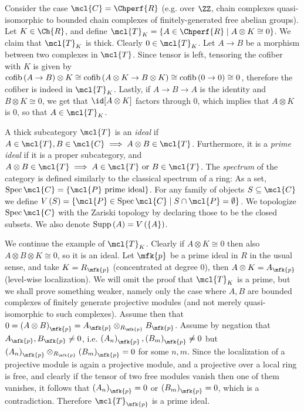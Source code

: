 \begin{example}\label{chperf-tk}
	Consider the case $\mcl{C} = \Chperf{R}$ (e.g. over $\ZZ$, chain complexes quasi-isomorphic to bounded chain complexes of finitely-generated free abelian groups).
	Let $K \in \Ch{R}$, and define
	$\mcl{T}_K = \left\{ A \in \Chperf{R} \mid A \otimes K \cong 0 \right\}$.
	We claim that $\mcl{T}_K$ is thick.
	Clearly $0 \in \mcl{T}_K$.
	Let $A \to B$ be a morphism between two complexes in $\mcl{T}$. Since tensor is left, tensoring the cofiber with $K$ is given by
	$\operatorname{cofib}\left(A \to B\right) \otimes K \cong \operatorname{cofib}\left(A \otimes K \to B \otimes K\right) \cong \operatorname{cofib}\left(0 \to 0\right) \cong 0$, therefore the cofiber is indeed in $\mcl{T}_K$.
	Lastly, if $A \to B \to A$ is the identity and $B \otimes K \cong 0$, we get that $\id[A \otimes K]$ factors through $0$, which implies that $A \otimes K$ is $0$, so that $A \in \mcl{T}_K$.
\end{example}

\begin{definition}
	A thick subcategory $\mcl{T}$ is an \emph{ideal} if $A \in \mcl{T}, B \in \mcl{C} \implies A \otimes B \in \mcl{T}$.
	Furthermore, it is a \emph{prime ideal} if it is a proper subcategory, and $A \otimes B \in \mcl{T} \implies A \in \mcl{T} \textrm{ or } B \in \mcl{T}$.
	The \emph{spectrum} of the category is defined similarly to the classical spectrum of a ring:
	As a set, $\spec \mcl{C} = \left\{ \mcl{P}\textrm{ prime ideal} \right\}$.
	For any family of objects $S \subseteq \mcl{C}$ we define $V\left(S\right) = \left\{ \mcl{P} \in \spec \mcl{C} \mid S \cap \mcl{P} = \emptyset \right\}$.
	We topologize $\spec \mcl{C}$ with the Zariski topology by declaring those to be the closed subsets.
	We also denote $\operatorname{Supp}\left(A\right) = V\left(\left\{ A \right\}\right)$.
\end{definition}

\begin{example}
	We continue the example of $\mcl{T}_K$.
	Clearly if $A \otimes K \cong 0$ then also $A \otimes B \otimes K \cong 0$, so it is an ideal.
	Let $\mfk{p}$ be a prime ideal in $R$ in the usual sense, and take $K = R_\mfk{p}$ (concentrated at degree $0$),
	then $A \otimes K = A_\mfk{p}$ (level-wise localization).
	We will omit the proof that $\mcl{T}_K$ is a prime, but we shall prove something weaker, namely only the case where $A,B$ are bounded complexes of finitely generate projective modules (and not merely quasi-isomorphic to such complexes).
	Assume then that
	$
	0
	= \left(A \otimes B\right)_\mfk{p}
	= A_\mfk{p} \otimes_{R_\mfk{p}} B_\mfk{p}
	$.
	Assume by negation that $A_\mfk{p}, B_\mfk{p} \neq 0$,
	i.e. $\left(A_n\right)_\mfk{p}, \left(B_m\right)_\mfk{p} \neq 0$ but $\left(A_n\right)_\mfk{p} \otimes_{R_\mfk{p}} \left(B_m\right)_\mfk{p} = 0$ for some $n,m$.
	Since the localization of a projective module is again a projective module, and a projective over a local ring is free, and clearly if the tensor of two free modules vanish then one of them vanishes, it follows that $\left(A_n\right)_\mfk{p} = 0$ or $\left(B_m\right)_\mfk{p} = 0$, which is a contradiction.
	Therefore $\mcl{T}_\mfk{p}$ is a prime ideal.
\end{example}

